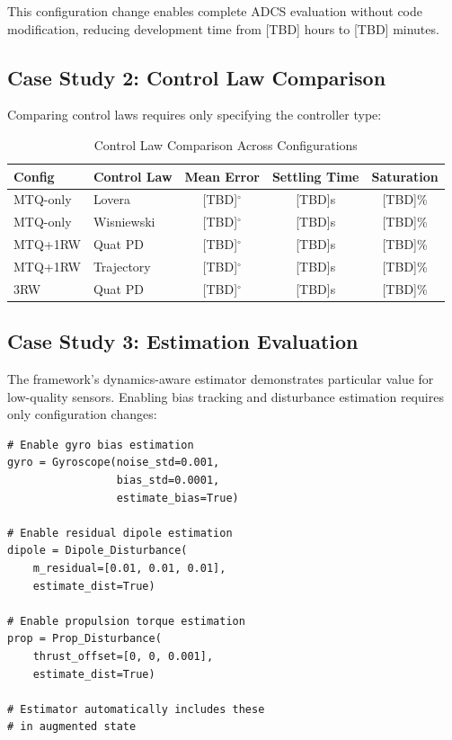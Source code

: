 \documentclass[conference]{IEEEtran}
\begin{document}
This configuration change enables complete ADCS evaluation without code modification, reducing development time from [TBD] hours to [TBD] minutes.

\subsection{Case Study 2: Control Law Comparison}\label{subsec:case2}

Comparing control laws requires only specifying the controller type:

\begin{table}[t]
    \centering
    \caption{Control Law Comparison Across Configurations}
    \label{tab:control_comparison}
    \begin{tabular}{llccc}
        \toprule
        Config & Control Law & Mean Error & Settling Time & Saturation \\
        \midrule
        MTQ-only & Lovera & [TBD]$^\circ$ & [TBD]s & [TBD]\% \\
        MTQ-only & Wisniewski & [TBD]$^\circ$ & [TBD]s & [TBD]\% \\
        MTQ+1RW & Quat PD & [TBD]$^\circ$ & [TBD]s & [TBD]\% \\
        MTQ+1RW & Trajectory & [TBD]$^\circ$ & [TBD]s & [TBD]\% \\
        3RW & Quat PD & [TBD]$^\circ$ & [TBD]s & [TBD]\% \\
        \bottomrule
    \end{tabular}
\end{table}

\subsection{Case Study 3: Estimation Evaluation}\label{subsec:case3}

The framework's dynamics-aware estimator demonstrates particular value for low-quality sensors. Enabling bias tracking and disturbance estimation requires only configuration changes:

\begin{lstlisting}[caption={Enabling bias and disturbance estimation}]
# Enable gyro bias estimation
gyro = Gyroscope(noise_std=0.001,
                 bias_std=0.0001,
                 estimate_bias=True)

# Enable residual dipole estimation
dipole = Dipole_Disturbance(
    m_residual=[0.01, 0.01, 0.01],
    estimate_dist=True)

# Enable propulsion torque estimation
prop = Prop_Disturbance(
    thrust_offset=[0, 0, 0.001],
    estimate_dist=True)

# Estimator automatically includes these
# in augmented state
\end{lstlisting}
\end{document}
